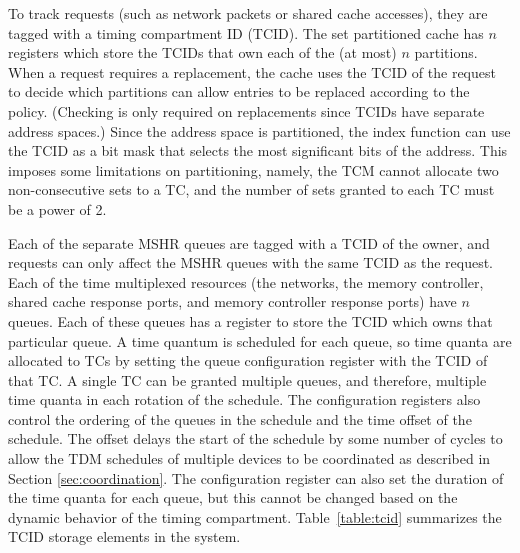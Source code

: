 To track requests (such as network packets or shared cache accesses), they are 
tagged with a timing compartment ID (TCID). The set partitioned cache has $n$ 
registers which store the TCIDs that own each of the (at most) $n$ partitions.
When a request requires a replacement, the cache uses the TCID of the request
to decide which partitions can allow entries to be replaced according to the
policy. (Checking is only required on replacements since TCIDs have separate
address spaces.) Since the address space is partitioned, the index function can 
use the TCID as a bit mask that selects the most significant bits of the 
address. This imposes some limitations on partitioning, namely, the TCM cannot 
allocate two non-consecutive sets to a TC, and the number of sets granted to 
each TC must be a power of 2.

Each of the separate MSHR queues are tagged with a TCID of the owner, and 
requests can only affect the MSHR queues with the same TCID as the request. 
Each of the time multiplexed resources (the networks, the memory controller, 
shared cache response ports, and memory controller response ports) have $n$ 
queues.  Each of these queues has a register to store the TCID which owns that 
particular queue. A time quantum is scheduled for each queue, so time quanta 
are allocated to TCs by setting the queue configuration register with the TCID 
of that TC. A single TC can be granted multiple queues, and therefore, multiple 
time quanta in each rotation of the schedule. The configuration registers also 
control the ordering of the queues in the schedule and the time offset of the 
schedule. The offset delays the start of the schedule by some number of cycles 
to allow the TDM schedules of multiple devices to be coordinated as described 
in Section \ref{sec:coordination}. The configuration register can also set the 
duration of the time quanta for each queue, but this cannot be changed based on 
the dynamic behavior of the timing compartment.
Table~\ref{table:tcid} summarizes the TCID storage elements in the system.


